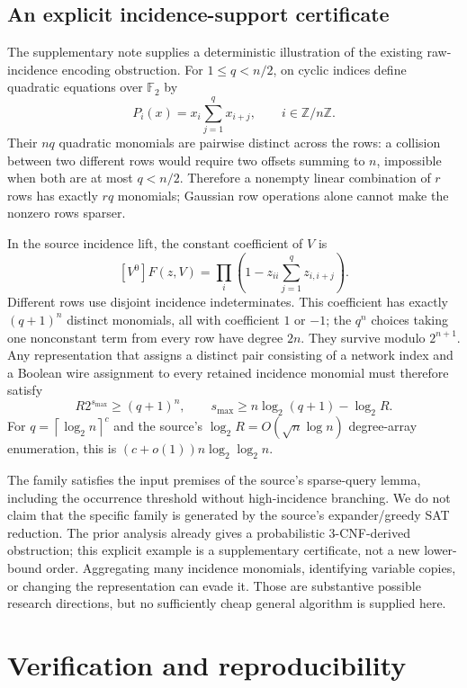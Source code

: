 \documentclass[11pt,letterpaper]{article}
\theoremstyle{remark}\newtheorem{remark}[theorem]{Remark}
\newcommand{\ceil}[1]{\left\lceil #1\right\rceil}
\begin{document}
\subsection{An explicit incidence-support certificate}

The supplementary note supplies a deterministic illustration of the
existing raw-incidence encoding obstruction. For $1\le q<n/2$, on cyclic
indices define quadratic equations over $\mathbb F_2$ by
\[
 P_i(x)=x_i\sum_{j=1}^q x_{i+j},\qquad i\in\mathbb Z/n\mathbb Z.
\]
Their $nq$ quadratic monomials are pairwise distinct across the rows: a
collision between two different rows would require two offsets summing to
$n$, impossible when both are at most $q<n/2$. Therefore a nonempty linear
combination of $r$ rows has exactly $rq$ monomials; Gaussian row operations
alone cannot make the nonzero rows sparser.

In the source incidence lift, the constant coefficient of $V$ is
\[
 [V^0]F(z,V)=\prod_i\left(1-z_{ii}\sum_{j=1}^q z_{i,i+j}\right).
\]
Different rows use disjoint incidence indeterminates. This coefficient has
exactly $(q+1)^n$ distinct monomials, all with coefficient $1$ or $-1$;
the $q^n$ choices taking one nonconstant term from every row have degree
$2n$. They survive modulo $2^{n+1}$. Any representation that assigns a
distinct pair consisting of a network index and a Boolean wire assignment
to every retained incidence monomial must therefore satisfy
\[
 R2^{s_{\max}}\ge(q+1)^n,
 \qquad s_{\max}\ge n\log_2(q+1)-\log_2R.
\]
For $q=\ceil{\log_2n}^{c}$ and the source's
$\log_2R=O(\sqrt n\log n)$ degree-array enumeration, this is
$(c+o(1))n\log_2\log_2n$.

The family satisfies the input premises of the source's sparse-query lemma,
including the occurrence threshold without high-incidence branching.
We do not claim that the specific family is generated by the source's
expander/greedy SAT reduction. The prior analysis already gives a
probabilistic 3-CNF-derived obstruction; this explicit example is a
supplementary certificate, not a new lower-bound order. Aggregating many
incidence monomials, identifying variable copies, or changing the
representation can evade it. Those are substantive possible research
directions, but no sufficiently cheap general algorithm is supplied here.

\section{Verification and reproducibility}
\label{sec:checks}
\end{document}
